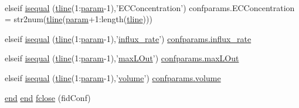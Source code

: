\begin{DoxyCompactItemize}
$$\item 
elseif \hyperlink{a00028_a020bdc51aec69d386d296cef12a4103f}{isequal} (\hyperlink{a00033_a6791897869706b835f1a5d305739a415}{tline}(1\+:\hyperlink{a00033_a51f20d6b1b54a2eee3be0e8adc96a0ae}{param}-\/1),'E\+C\+Concentration') confparams.\+E\+C\+Concentration = str2num(\hyperlink{a00033_a6791897869706b835f1a5d305739a415}{tline}(\hyperlink{a00033_a51f20d6b1b54a2eee3be0e8adc96a0ae}{param}+1\+:length(\hyperlink{a00033_a6791897869706b835f1a5d305739a415}{tline})))
\item 
elseif \hyperlink{a00028_a70d26090f1be04e2d5574b92311c5e60}{isequal} (\hyperlink{a00033_a6791897869706b835f1a5d305739a415}{tline}(1\+:\hyperlink{a00033_a51f20d6b1b54a2eee3be0e8adc96a0ae}{param}-\/1),'\hyperlink{a00113_ad795c71664f3161dc8f7a769341daadf}{influx\+\_\+rate}') \hyperlink{a00113_ad795c71664f3161dc8f7a769341daadf}{confparams.\+influx\+\_\+rate}
\item 
elseif \hyperlink{a00028_af9bdb7d08f0bf513092ed132ab8fd463}{isequal} (\hyperlink{a00033_a6791897869706b835f1a5d305739a415}{tline}(1\+:\hyperlink{a00033_a51f20d6b1b54a2eee3be0e8adc96a0ae}{param}-\/1),'\hyperlink{a00113_abb126c97fed10420e64f85923bf5e04b}{max\+L\+Out}') \hyperlink{a00113_abb126c97fed10420e64f85923bf5e04b}{confparams.\+max\+L\+Out}
\item 
elseif \hyperlink{a00028_ab95e741dbc04dc8030ed60d7b15454a1}{isequal} (\hyperlink{a00033_a6791897869706b835f1a5d305739a415}{tline}(1\+:\hyperlink{a00033_a51f20d6b1b54a2eee3be0e8adc96a0ae}{param}-\/1),'\hyperlink{a00113_a9bc498ccac8db41438f855f5dd3f4c05}{volume}') \hyperlink{a00113_a9bc498ccac8db41438f855f5dd3f4c05}{confparams.\+volume}
\item 
\hyperlink{a00025_afb358f48b1646c750fb9da6c6585be2b}{end} \hyperlink{a00025_afb358f48b1646c750fb9da6c6585be2b}{end} \hyperlink{a00028_a66a54a4db5a27a03991b5f3034bbc6a4}{fclose} (fid\+Conf)
\end{DoxyCompactItemize}

